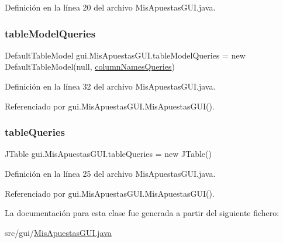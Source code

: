 Definición en la línea 20 del archivo Mis\+Apuestas\+G\+U\+I.\+java.

\mbox{\label{classgui_1_1MisApuestasGUI_a9585a674d2e1b1868bc189e3c356e574}} 
\subsubsection{\texorpdfstring{tableModelQueries}{tableModelQueries}}
{\footnotesize\ttfamily Default\+Table\+Model gui.\+Mis\+Apuestas\+G\+U\+I.\+table\+Model\+Queries = new Default\+Table\+Model(null, \mbox{\hyperlink{classgui_1_1MisApuestasGUI_a7c997693da66f870e09041a88e02291e}{column\+Names\+Queries}})\hspace{0.3cm}{\ttfamily [private]}}



Definición en la línea 32 del archivo Mis\+Apuestas\+G\+U\+I.\+java.



Referenciado por gui.\+Mis\+Apuestas\+G\+U\+I.\+Mis\+Apuestas\+G\+U\+I().

\mbox{\label{classgui_1_1MisApuestasGUI_ac491e3e6bdb260a5f8cf5a481d7f202d}} 
\subsubsection{\texorpdfstring{tableQueries}{tableQueries}}
{\footnotesize\ttfamily J\+Table gui.\+Mis\+Apuestas\+G\+U\+I.\+table\+Queries = new J\+Table()\hspace{0.3cm}{\ttfamily [private]}}



Definición en la línea 25 del archivo Mis\+Apuestas\+G\+U\+I.\+java.



Referenciado por gui.\+Mis\+Apuestas\+G\+U\+I.\+Mis\+Apuestas\+G\+U\+I().



La documentación para esta clase fue generada a partir del siguiente fichero\+:\begin{DoxyCompactItemize}
\item 
src/gui/\mbox{\hyperlink{MisApuestasGUI_8java}{Mis\+Apuestas\+G\+U\+I.\+java}}\end{DoxyCompactItemize}
